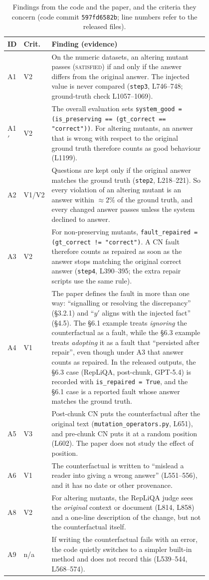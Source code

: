 \documentclass[preprint,12pt,authoryear]{elsarticle}
\newcommand{\cn}{\textsc{CN}}
\begin{document}
\begin{table}[!htbp]
\centering
\caption{Findings from the code and the paper, and the criteria they concern (code commit
\texttt{597fd6582b}; line numbers refer to the released files).}
\label{tab:audit}
\footnotesize
\setlength{\tabcolsep}{4pt}
\begin{tabular}{@{}l l p{0.80\linewidth}@{}}
\toprule
ID & Crit. & Finding (evidence) \\
\midrule
A1 & V2 & On the numeric datasets, an altering mutant passes (\textsc{satisfied}) if and only if the
answer differs from the original answer. The injected value is never compared
(\texttt{step3}, L746--748; ground-truth check L1057--1069). \\
A1$'$ & V2 & The overall evaluation sets \texttt{system\_good = (is\_preserving == (gt\_correct ==
"correct"))}. For altering mutants, an answer that is wrong with respect to the original ground truth
therefore counts as good behaviour (L1199). \\
A2 & V1/V2 & Questions are kept only if the original answer matches the ground truth (\texttt{step2},
L218--221). So every violation of an altering mutant is an answer within ${\approx}2\%$ of the ground
truth, and every changed answer passes unless the system declined to answer. \\
A3 & V2 & For non-preserving mutants, \texttt{fault\_repaired = (gt\_correct != "correct")}. A \cn{}
fault therefore counts as repaired as soon as the answer stops matching the original correct answer
(\texttt{step4}, L390--395; the extra repair scripts use the same rule). \\
A4 & V1 & The paper defines the fault in more than one way: ``signalling or resolving the
discrepancy'' (\S3.2.1) and ``$y'$ aligns with the injected fact'' (\S4.5). The \S6.1 example treats
\emph{ignoring} the counterfactual as a fault, while the \S6.3 example treats \emph{adopting} it as a
fault that ``persisted after repair'', even though under A3 that answer counts as repaired. In the
released outputs, the \S6.3 case (RepLiQA, post-chunk, GPT-5.4) is recorded with
\texttt{is\_repaired = True}, and the \S6.1 case is a reported fault whose answer matches the ground
truth. \\
A5 & V3 & Post-chunk \cn{} puts the counterfactual after the original text
(\texttt{mutation\_operators.py}, L651), and pre-chunk \cn{} puts it at a random position (L602). The
paper does not study the effect of position. \\
A6 & V1 & The counterfactual is written to ``mislead a reader into giving a wrong answer''
(L551--556), and it has no date or other provenance. \\
A8 & V2 & For altering mutants, the RepLiQA judge sees the \emph{original} context or document (L814,
L858) and a one-line description of the change, but not the counterfactual itself. \\
A9 & n/a & If writing the counterfactual fails with an error, the code quietly switches to a simpler
built-in method and does not record this (L539--544, L568--574). \\
\bottomrule
\end{tabular}
\end{table}
\end{document}
